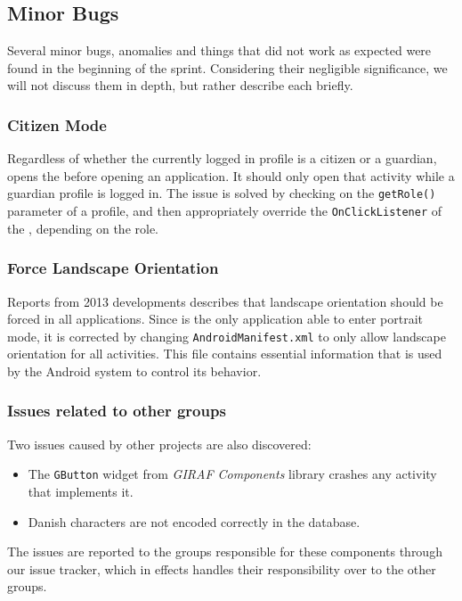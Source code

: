 \subsection{Minor Bugs}

Several minor bugs, anomalies and things that did not work as expected were found in the beginning of the sprint.
Considering their negligible significance, we will not discuss them in depth, but rather describe each briefly.

\subsubsection{Citizen Mode}
Regardless of whether the currently logged in profile is a citizen or a guardian, \launcher opens the \profileselectionactivity before opening an application.
It should only open that activity while a guardian profile is logged in.
The issue is solved by checking on the \lstinline{getRole()} parameter of a profile, and then appropriately override the \lstinline{OnClickListener} of the \profileselectionactivity, depending on the role. 

\subsubsection{Force Landscape Orientation}
Reports from 2013 developments describes that landscape orientation should be forced in all \giraf applications.\cite[p. 33]{2013report}
Since \launcher is the only application able to enter portrait mode, it is corrected by changing \lstinline{AndroidManifest.xml} to only allow landscape orientation for all activities.
This file contains essential information that is used by the Android system to control its behavior\cite{appManifest}.

\subsubsection{Issues related to other groups}
Two issues caused by other projects are also discovered:

\begin{itemize}
\item The \lstinline{GButton} widget from \textit{GIRAF Components} library crashes any activity that implements it.
\item Danish characters are not encoded correctly in the database.
\end{itemize}

The issues are reported to the groups responsible for these components through our issue tracker, which in effects handles their responsibility over to the other groups.